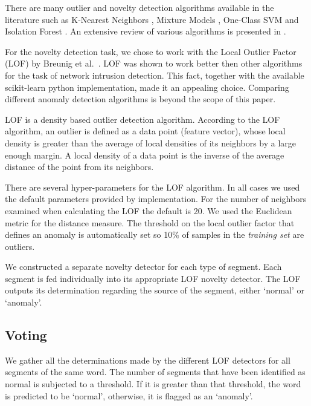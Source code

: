 \documentclass[conference]{IEEEtran}
\begin{document}
  There are many outlier and novelty detection algorithms available in the literature such as K-Nearest Neighbors \cite{hautamaki2004outlier}, Mixture Models \cite{}, One-Class SVM \cite{} and Isolation Forest \cite{liu2008isolation}. An extensive review of various algorithms is presented in \cite{pimentel2014review}.
  
  For the novelty detection task, we chose to work with the Local Outlier Factor (LOF) by Breunig et al.\ \cite{breunig2000lof}. LOF was shown to work better then other algorithms for the task of network intrusion detection\cite{lazarevic2003comparative}. This fact, together with the available scikit-learn \cite{scikit-learn} python implementation, made it an appealing choice. Comparing different anomaly detection algorithms is beyond the scope of this paper.
  
  LOF is a density based outlier detection algorithm. According to the LOF algorithm, an outlier is defined as a data point (feature vector), whose local density is greater than the average of local densities of its neighbors by a large enough margin. A local density of a data point is the inverse of the average distance of the point from its neighbors.
  
  There are several hyper-parameters for the LOF algorithm. In all cases we used the default parameters provided by implementation. For the number of neighbors examined when calculating the LOF the default is 20. We used the Euclidean metric for the distance measure. The threshold on the local outlier factor that defines an anomaly is automatically set so 10\% of samples in the \textit{training set} are outliers.
  
  We constructed a separate novelty detector for each type of segment. Each segment is fed individually into its appropriate LOF novelty detector. The LOF outputs its determination regarding the source of the segment, either `normal' or `anomaly'.
  
\subsection{Voting}
  We gather all the determinations made by the different LOF detectors for all segments of the same word. The number of segments that have been identified as normal is subjected to a threshold. If it is greater than that threshold, the word is predicted to be `normal', otherwise, it is flagged as an `anomaly'.
  
\end{document}
